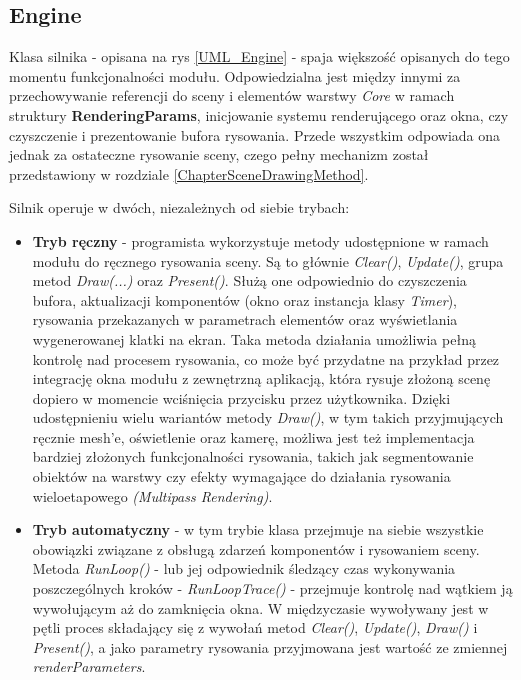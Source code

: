 \subsection{Engine}
	Klasa silnika - opisana na rys \ref{UML_Engine} - spaja większość opisanych do tego momentu funkcjonalności modułu. Odpowiedzialna jest między innymi za przechowywanie referencji do sceny i elementów warstwy \textit{Core} w ramach struktury \textbf{RenderingParams}, inicjowanie systemu renderującego oraz okna, czy czyszczenie i prezentowanie bufora rysowania. Przede wszystkim odpowiada ona jednak za ostateczne rysowanie sceny, czego pełny mechanizm został przedstawiony w rozdziale \ref{ChapterSceneDrawingMethod}. 
	
	Silnik operuje w dwóch, niezależnych od siebie trybach:
	\begin{itemize}
		\item \textbf{Tryb ręczny} - programista wykorzystuje metody udostępnione w ramach modułu do ręcznego rysowania sceny. Są to głównie \textit{Clear()}, \textit{Update()}, grupa metod \textit{Draw(...)} oraz \textit{Present()}. Służą one odpowiednio do czyszczenia bufora, aktualizacji komponentów (okno oraz instancja klasy \textit{Timer}), rysowania przekazanych w parametrach elementów oraz wyświetlania wygenerowanej klatki na ekran. Taka metoda działania umożliwia pełną kontrolę nad procesem rysowania, co może być przydatne na przykład przez integrację okna modułu z zewnętrzną aplikacją, która rysuje złożoną scenę dopiero w momencie wciśnięcia przycisku przez użytkownika. Dzięki udostępnieniu wielu wariantów metody \textit{Draw()}, w tym takich przyjmujących ręcznie mesh'e, oświetlenie oraz kamerę, możliwa jest też implementacja bardziej złożonych funkcjonalności rysowania, takich jak segmentowanie obiektów na warstwy czy efekty wymagające do działania rysowania wieloetapowego \textit{(Multipass Rendering)}.
		\item \textbf{Tryb automatyczny} - w tym trybie klasa przejmuje na siebie wszystkie obowiązki związane z obsługą zdarzeń komponentów i rysowaniem sceny. Metoda \textit{RunLoop()} - lub jej odpowiednik śledzący czas wykonywania poszczególnych kroków - \textit{RunLoopTrace()} - przejmuje kontrolę nad wątkiem ją wywołującym aż do zamknięcia okna. W międzyczasie wywoływany jest w pętli proces składający się z wywołań metod \textit{Clear()}, \textit{Update()}, \textit{Draw()} i \textit{Present()}, a jako parametry rysowania przyjmowana jest wartość ze zmiennej \textit{renderParameters}.
	\end{itemize}
	
